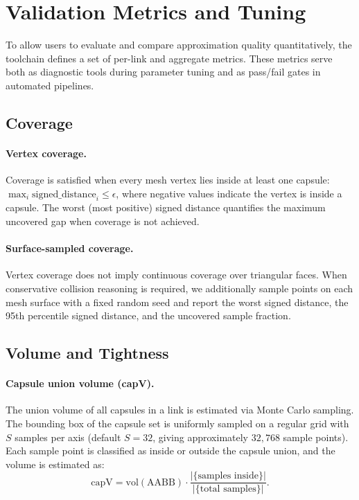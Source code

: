 \section{Validation Metrics and Tuning}
\label{sec:metrics}

To allow users to evaluate and compare approximation quality quantitatively, the toolchain defines a set of per-link and aggregate metrics.
These metrics serve both as diagnostic tools during parameter tuning and as pass/fail gates in automated pipelines.

\subsection{Coverage}

\paragraph{Vertex coverage.}
Coverage is satisfied when every mesh vertex lies inside at least one capsule: $\max_i \mathrm{signed\_distance}_i \leq \epsilon$, where negative values indicate the vertex is inside a capsule. The worst (most positive) signed distance quantifies the maximum uncovered gap when coverage is not achieved.

\paragraph{Surface-sampled coverage.}
Vertex coverage does not imply continuous coverage over triangular faces. When conservative collision reasoning is required, we additionally sample points on each mesh surface with a fixed random seed and report the worst signed distance, the 95th percentile signed distance, and the uncovered sample fraction.

\subsection{Volume and Tightness}

\paragraph{Capsule union volume (capV).}
The union volume of all capsules in a link is estimated via Monte Carlo sampling.
The bounding box of the capsule set is uniformly sampled on a regular grid with $S$ samples per axis (default $S = 32$, giving approximately $32{,}768$ sample points).
Each sample point is classified as inside or outside the capsule union, and the volume is estimated as:
\begin{equation}
\mathrm{capV} = \mathrm{vol}(\mathrm{AABB}) \cdot \frac{|\{\text{samples inside}\}|}{|\{\text{total samples}\}|}.
\label{eq:capv}
\end{equation}

